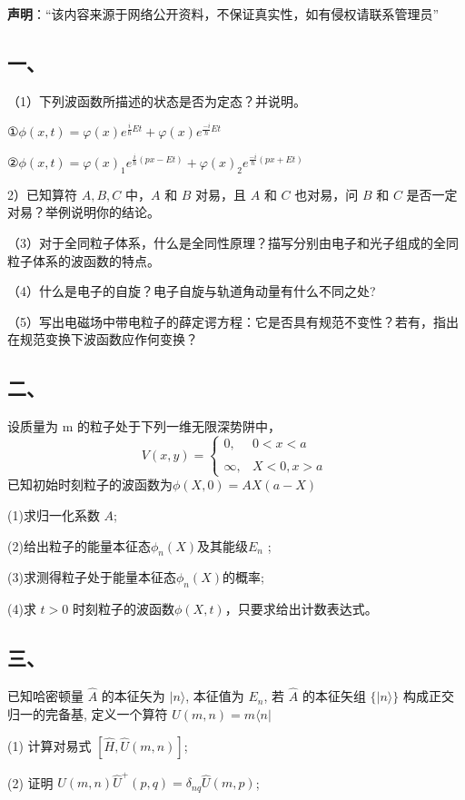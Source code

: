 
\textbf{声明}：“该内容来源于网络公开资料，不保证真实性，如有侵权请联系管理员”

\subsection{一、}
（1）下列波函数所描述的状态是否为定态？并说明。

①$\phi(x,t)=\varphi(x)e^{\frac{i}{\hbar}Et}+\varphi(x)e^{\frac{-i}{\hbar}Et}$

②$\phi(x,t)=\varphi(x)_1e^{\frac{i}{\hbar}(px-Et)}+\varphi(x)_2e^{\frac{-i}{\hbar}(px+Et)}$

2）已知算符 $A,B,C$ 中，$A$ 和 $B$ 对易，且 $A$ 和 $C$ 也对易，问 $B$ 和 $C$ 是否一定对易？举例说明你的结论。

（3）对于全同粒子体系，什么是全同性原理？描写分别由电子和光子组成的全同粒子体系的波函数的特点。

（4）什么是电子的自旋？电子自旋与轨道角动量有什么不同之处?

（5）写出电磁场中带电粒子的薛定谔方程：它是否具有规范不变性？若有，指出在规范变换下波函数应作何变换？
\subsection{二、}
设质量为 m 的粒子处于下列一维无限深势阱中，
$$V(x,y)=\begin{cases}
0,&0 < x <a \\\\
\infty ,& X < 0,  x>a 
\end{cases}~
$$
已知初始时刻粒子的波函数为$\phi(X,0)=AX(a-X)$

(1)求归一化系数 $A$;

(2)给出粒子的能量本征态$\phi_n(X)$及其能级$E_n$ ;

(3)求测得粒子处于能量本征态$\phi_n(X)$的概率;

(4)求 $t>0$ 时刻粒子的波函数$\phi(X,t)$，只要求给出计数表达式。
\subsection{三、}
已知哈密顿量 $\hat{A}$ 的本征矢为 $|n\rangle$, 本征值为 $E_n$, 若 $\hat{A}$ 的本征矢组 $\{|n\rangle\}$ 构成正交归一的完备基, 定义一个算符 $\hat{U}(m,n)=m\langle n|$

(1) 计算对易式 $\left[\hat{H}, \hat{U}(m,n)\right]$;

(2) 证明 $\hat{U}(m,n)\hat{U}^+(p,q) = \delta_{nq} \hat{U}(m,p)$;

